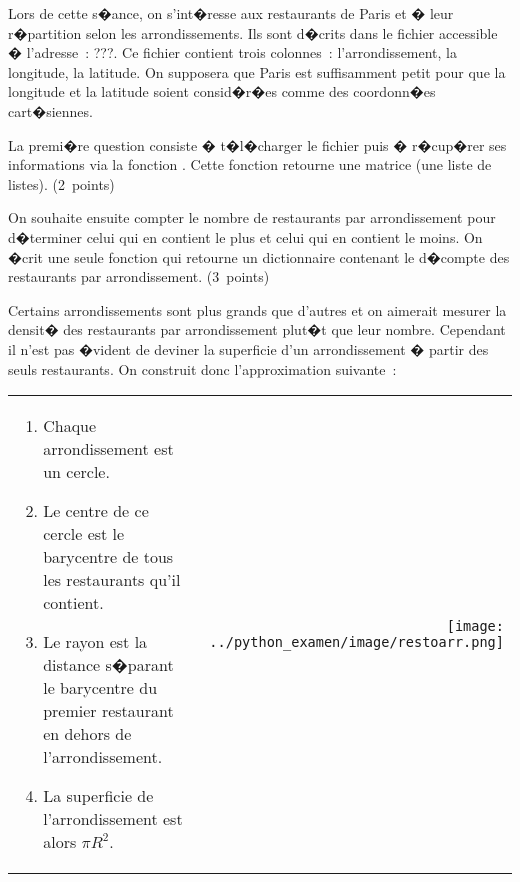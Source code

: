 %




\exosubject{}
\begin{xexercicenot}\label{td_note_label_2011}%

Lors de cette s�ance, on s'int�resse aux restaurants de Paris et � leur r�partition selon les arrondissements. Ils sont d�crits dans le fichier accessible � l'adresse~: ???. Ce fichier contient trois colonnes~: l'arrondissement, la longitude, la latitude. On supposera que Paris est suffisamment petit pour que la longitude et la latitude soient consid�r�es comme des coordonn�es cart�siennes.


\exequest La premi�re question consiste � t�l�charger le fichier puis � r�cup�rer ses informations via la fonction . Cette fonction retourne une matrice (une liste de listes). (2~points)

\exequest On souhaite ensuite compter le nombre de restaurants par arrondissement pour d�terminer celui qui en contient le plus et celui qui en contient le moins. On �crit une seule fonction  qui retourne un dictionnaire contenant le d�compte des restaurants par arrondissement. (3~points)

\exequest Certains arrondissements sont plus grands que d'autres et on aimerait mesurer la densit� des restaurants par arrondissement plut�t que leur nombre. Cependant il n'est pas �vident de deviner la superficie d'un arrondissement � partir des seuls restaurants. On construit donc l'approximation suivante~:

\vspace{-0.5cm}
\begin{tabularx}{\textwidth}{@{}Xr@{}}
\vspace{-4cm}
\begin{enumerate}
\item Chaque arrondissement est un cercle.
\item Le centre de ce cercle est le barycentre de tous les restaurants qu'il contient.
\item Le rayon est la distance s�parant le barycentre du premier restaurant en dehors de l'arrondissement.
\item La superficie de l'arrondissement est alors $\pi R^2$.
\end{enumerate}
&
\texttt{[image: ../python\_examen/image/restoarr.png]} 
\end{tabularx}


\end{xexercicenot}
